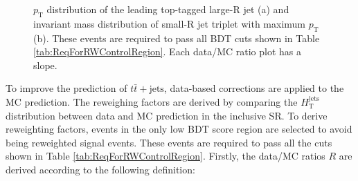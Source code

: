 \begin{figure}[H]
  \caption{$p_{\text{T}}$ distribution of the leading top-tagged large-R jet (a) and invariant mass distribution of small-R jet triplet with maximum $p_{\text{T}}$ (b). These events are required to pass all BDT cuts shown in Table \ref{tab:ReqForRWControlRegion}. Each data/MC ratio plot has a slope.}
  \label{fig:DataMCComparison_In_LowBDTSocreRegion}
\end{figure}


To improve the prediction of $t\bar{t}+\text{jets}$, data-based corrections are applied to the MC prediction. The reweighing factors are derived by comparing the $H_{\text{T}}^{\text{jets}}$ distribution between data and MC prediction in the inclusive SR. To derive reweighting factors, events in the only low BDT score region are selected to avoid being reweighted signal events. These events are required to pass all the cuts shown in Table \ref{tab:ReqForRWControlRegion}. Firstly, the data/MC ratios $R$ are derived according to the following definition:

